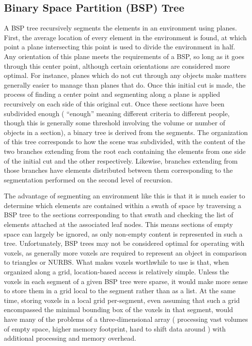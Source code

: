 \documentclass[onecolumn, draftclsnofoot,10pt, compsoc]{IEEEtran}
\begin{document}
\subsection{Binary Space Partition (BSP) Tree}
A BSP tree recursively segments the elements in an environment using planes. First, the average location of every element in the environment is found, at which point a plane intersecting this point is used to divide the environment in half. Any orientation of this plane meets the requirements of a BSP, so long as it goes through this center point, although certain orientations are considered more optimal. For instance, planes which do not cut through any objects make matters generally easier to manage than planes that do. Once this initial cut is made, the process of finding a center point and segmenting along a plane is applied recursively on each side of this original cut. Once these sections have been subdivided enough ( “enough” meaning different criteria to different people, though this is generally some threshold involving the volume or number of objects in a section), a binary tree is derived from the segments. The organization of this tree corresponds to how the scene was subdivided, with the content of the two branches extending from the root each containing the elements from one side of the initial cut and the other respectively. Likewise, branches extending from those branches have elements distributed between them corresponding to the segmentation performed on the second level of recursion.

The advantage of segmenting an environment like this is that it is much easier to determine which elements are contained within a swath of space by traversing a BSP tree to the sections corresponding to that swath and checking the list of elements attached at the associated leaf nodes. This means sections of empty space can largely be ignored, as only non-empty content is represented in such a tree. Unfortunately, BSP trees may not be considered optimal for operating with voxels, as generally more voxels are required to represent an object in comparison to triangles or NURBS. What makes voxels worthwhile to use is that, when organized along a grid, location-based access is relatively simple. Unless the voxels in each segment of a given BSP tree were sparse, it would make more sense to store them in a grid local to the segment rather than as a list. At the same time, storing voxels in a local grid per-segment, even assuming that such a grid encompassed the minimal bounding box of the voxels in that segment, would have many of the problems of a three-dimensional array ( processing vast volumes of empty space, higher memory footprint, hard to shift data around ) with additional processing and memory overhead.
\end{document}
